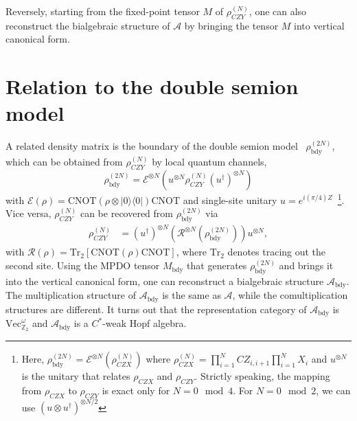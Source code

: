 \documentclass[prx, twocolumn, superscriptaddress, dvipsnames]{revtex4-2}
\theoremstyle{definition}
\newcommand{\tr}{\mathrm{Tr}}
\newcommand{\mA}{\mathcal{A}}
\newcommand{\dg}{\dagger}
\newcommand{\bdy}{\text{bdy}}
\newcommand{\CNOT}{\text{CNOT}}
\begin{document}
Reversely, starting from the fixed-point tensor $M$ of $\rho_{CZY}^{(N)}$, one can also reconstruct the bialgebraic structure of $\mA$ by bringing the tensor $M$ into vertical canonical form.

\section{Relation to the double semion model}
\label{sec:relation}
A related density matrix is the boundary of the double semion model~\cite{xu2018tensor} $\rho^{(2N)}_{\bdy}$, which can be obtained from $\rho_{CZY}^{(N)}$ by local quantum channels,
\begin{equation}\label{eq:CZX to semion}
    \rho_{\bdy}^{(2N)}=\mathcal{E}^{\otimes N}(u^{\otimes N} \rho_{CZY}^{(N)} (u^\dg)^{\otimes N})
\end{equation}
with $\mathcal{E}(\rho)=\CNOT (\rho\otimes|0\rangle\langle 0|)\CNOT$ and single-site unitary $u=e^{i(\pi/4)Z}$~\footnote{Here, $\rho_{\bdy}^{(2N)}=\mathcal{E}^{\otimes N}(\rho_{CZX}^{(N)})$ where $\rho_{CZX}^{(N)}=\prod_{i=1}^{N} CZ_{i,i+1} \prod_{i=1}^{N} X_i$ and $u^{\otimes N}$ is the unitary that relates $\rho_{CZX}$ and $\rho_{CZY}$. Strictly speaking, the mapping from $\rho_{CZX}$ to $\rho_{CZY}$ is exact only for $N=0 \mod 4$. For $N=0\mod 2$, we can use $(u\otimes u^\dg)^{\otimes N/2}$}. Vice versa, $\rho_{CZY}^{(N)}$ can be recovered from $\rho_{\bdy}^{(2N)}$ via
\begin{equation}
\begin{aligned}
    \rho_{CZY}^{(N)} &= (u^\dg)^{\otimes N}\left(\mathcal{R}^{\otimes N}(\rho_{\bdy}^{(2N)})\right) u^{\otimes N},
\end{aligned}
\end{equation}
with $ \mathcal{R}(\rho) = \tr_2  [\CNOT (\rho) \CNOT]$, where $\tr_2$ denotes tracing out the second site. Using the MPDO tensor $M_\bdy$ that generates $\rho_{\bdy}^{(2N)}$ and brings it into the vertical canonical form, one can reconstruct a bialgebraic structure $\mA_\bdy$. The multiplication structure of $\mA_\bdy$ is the same as $\mA$, while the comultiplication structures are different. It turns out that the representation category of $\mA_\bdy$ is $\text{Vec}_{\mathbb{Z}_2}^\omega$ and $\mA_\bdy$ is a $C^*$-weak Hopf algebra.  
\end{document}
